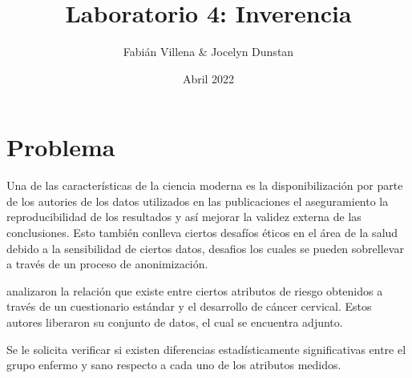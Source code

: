 \documentclass{article}
\title{Laboratorio 4: Inverencia}
\author{Fabián Villena \& Jocelyn Dunstan}
\date{Abril 2022}
\begin{document}
\maketitle

\section{Problema}

Una de las características de la ciencia moderna es la disponibilización por parte de los autories de los datos utilizados en las publicaciones el aseguramiento la reproducibilidad de los resultados y así mejorar la validez externa de las conclusiones. Esto también conlleva ciertos desafíos éticos en el área de la salud debido a la sensibilidad de ciertos datos, desafios los cuales se pueden sobrellevar a través de un proceso de anonimización.

\citeauthor{Sobar2016} analizaron la relación que existe entre ciertos atributos de riesgo obtenidos a través de un cuestionario estándar y el desarrollo de cáncer cervical. Estos autores liberaron su conjunto de datos, el cual se encuentra adjunto.

Se le solicita verificar si existen diferencias estadísticamente significativas entre el grupo enfermo y sano respecto a cada uno de los atributos medidos.

\printbibliography
\end{document}
